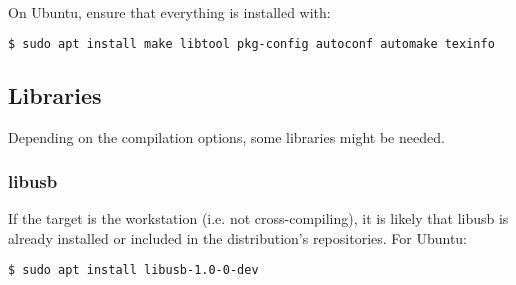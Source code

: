 \documentclass{article}
\begin{document}
    On Ubuntu, ensure that everything is installed with:
    \begin{lstlisting}[language=bash]
    $ sudo apt install make libtool pkg-config autoconf automake texinfo
    \end{lstlisting}
    
    \subsection{Libraries}
    
    Depending on the compilation options, some libraries might be needed.
    
    \subsubsection{libusb}
    
    If the target is the workstation (i.e. not cross-compiling), it is likely that libusb is already installed or included in the distribution's repositories. For Ubuntu:
    \begin{lstlisting}[language=bash]
    $ sudo apt install libusb-1.0-0-dev
    \end{lstlisting}
    
\end{document}
